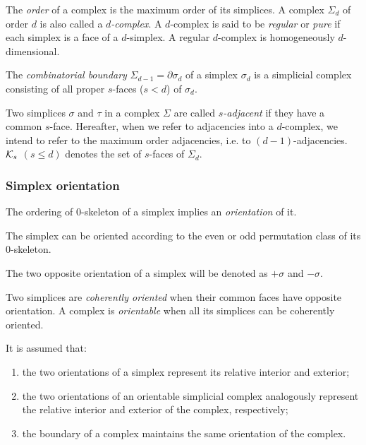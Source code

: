 The {\em order} of a complex is the maximum order of its simplices.  A 
complex $\Sigma_{d}$ of order $d$ is also called a {\em $d$-complex}.  
A $d$-complex is said to be {\em regular} or {\em pure} if each 
simplex is a face of a $d$-simplex. A regular $d$-complex is 
homogeneously $d$-dimensional.
 
The \emph{combinatorial boundary} $\Sigma_{d-1} = \partial\sigma_{d}$
of a simplex $\sigma_{d}$ is a simplicial complex consisting of all
proper $s$-faces ($s < d$) of $\sigma_{d}$.

Two simplices $\sigma$ and $\tau$ in a complex $\Sigma$ are
called {\em $s$-adjacent} if they have a common $s$-face.  Hereafter, when
we refer to adjacencies into a $d$-complex, we intend to refer to the
maximum order adjacencies, i.e. to $(d-1)$-adjacencies.  ${\cal K}_{s}$
$(s\leq d)$ denotes the set of $s$-faces of $\Sigma_{d}$.  


\subsubsection*{Simplex orientation}
The ordering of $0$-skeleton of a simplex implies an {\em 
orientation} of it.
\begin{definition}
The simplex can be oriented according to the 
even or odd permutation class of its $0$-skeleton.   
\end{definition}
The two opposite 
orientation of a simplex will be denoted as $+\sigma$ and $-\sigma$. 

\begin{definition}
Two simplices are {\em coherently oriented} when their common faces 
have opposite orientation.  A complex is {\em orientable} when all its 
simplices can be coherently oriented.
\end{definition}

It is assumed that: 
\begin{enumerate}
    
\item 
the two orientations of a simplex represent its relative
interior and exterior; 

\item
the two orientations of an orientable simplicial complex analogously
represent the relative interior and exterior of the complex,
respectively; 

\item
the boundary of a complex maintains the same orientation of the complex.
\end{enumerate}

